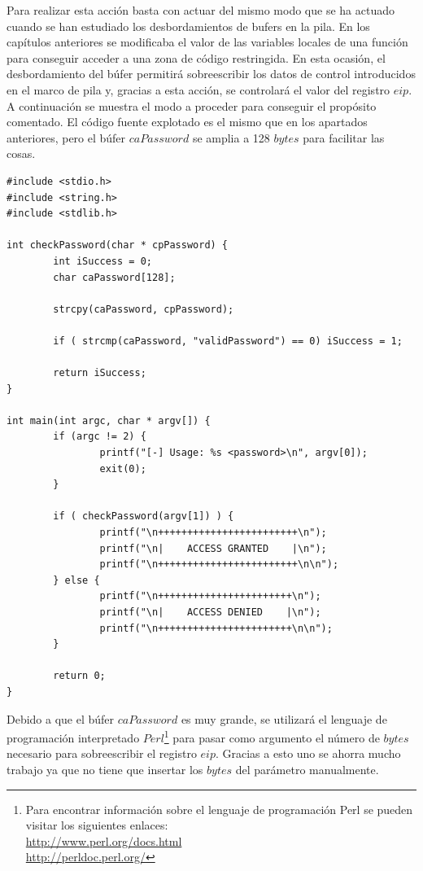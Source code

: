 \documentclass [titlepage, 12pt]{article}
\begin{document}
Para realizar esta acci\'on basta con actuar del mismo modo que se ha actuado cuando se han estudiado los desbordamientos de bufers en la pila. En los cap\'itulos anteriores se modificaba el valor de las variables locales de una funci\'on para conseguir acceder a una zona de c\'odigo restringida. En esta ocasi\'on, el desbordamiento del b\'ufer permitir\'a sobreescribir los datos de control introducidos en el marco de pila y, gracias a esta acci\'on, se controlar\'a el valor del registro $eip$. A continuaci\'on se muestra el modo a proceder para conseguir el prop\'osito comentado. El c\'odigo fuente explotado es el mismo que en los apartados anteriores, pero el b\'ufer $caPassword$ se amplia a 128 $bytes$ para facilitar las cosas.


\lstset{language=C++,caption=C\'odigo fuente vulnerable,label=fig:VulnerableCodeExploited}
\begin{lstlisting}
#include <stdio.h>
#include <string.h>
#include <stdlib.h>

int checkPassword(char * cpPassword) {
        int iSuccess = 0;
        char caPassword[128];

        strcpy(caPassword, cpPassword);

        if ( strcmp(caPassword, "validPassword") == 0) iSuccess = 1;

        return iSuccess;
}

int main(int argc, char * argv[]) {
        if (argc != 2) {
                printf("[-] Usage: %s <password>\n", argv[0]);
                exit(0);
        }

        if ( checkPassword(argv[1]) ) {
                printf("\n++++++++++++++++++++++++\n");
                printf("\n|    ACCESS GRANTED    |\n");
                printf("\n++++++++++++++++++++++++\n\n");
        } else {
                printf("\n+++++++++++++++++++++++\n");
                printf("\n|    ACCESS DENIED    |\n");
                printf("\n+++++++++++++++++++++++\n\n");
        }

        return 0;
}
\end{lstlisting}

Debido a que el b\'ufer $caPassword$ es muy grande, se utilizar\'a el lenguaje de programaci\'on interpretado $Perl$\footnote{Para encontrar informaci\'on sobre el lenguaje de programaci\'on Perl se pueden visitar los siguientes enlaces: \\ \url{http://www.perl.org/docs.html} \\ \url{http://perldoc.perl.org/}} para pasar como argumento el n\'umero de $bytes$ necesario para sobreescribir el registro $eip$. Gracias a esto uno se ahorra mucho trabajo ya que no tiene que insertar los $bytes$ del par\'ametro manualmente.
\end{document}

